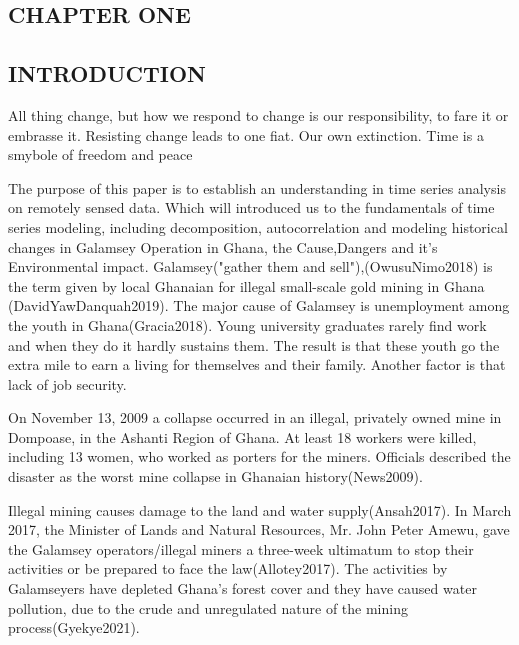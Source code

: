 \documentclass[10pt]{report}
\begin{document}
	\tableofcontents
	\begin{flushleft}
		\chapter{CHAPTER ONE}
		  \section{INTRODUCTION}
		  All thing change, but how we respond to change is our responsibility, to  fare it or embrasse it. Resisting change leads to one fiat. Our own extinction. Time is a smybole of freedom and peace
		  
		  The purpose of this paper is to establish an understanding in time series analysis on remotely sensed data. Which will introduced us to the fundamentals of time series modeling, including decomposition, autocorrelation and modeling historical changes in Galamsey Operation in Ghana, the Cause,Dangers and it’s Environmental impact.
		  Galamsey("gather them and sell"),(OwusuNimo2018) is the term given by local Ghanaian for illegal small-scale gold mining in Ghana (DavidYawDanquah2019). The major cause of Galamsey is unemployment among the youth in Ghana(Gracia2018). Young university graduates rarely find work and when they do it hardly sustains them. The result is that these youth go the extra mile to earn a living for themselves and their family.
		  Another factor is that lack of job security.
		  
		  On November 13, 2009 a collapse occurred in an illegal, privately owned mine in Dompoase, in the Ashanti Region of Ghana. At least 18 workers were killed, including 13 women, who worked as porters for the miners. Officials described the disaster as the worst mine collapse in Ghanaian history(News2009).
		  
		  Illegal mining causes damage to the land and water supply(Ansah2017). In March 2017, the Minister of Lands and Natural Resources, Mr. John Peter Amewu, gave the Galamsey operators/illegal miners a three-week ultimatum to stop their activities or be prepared to face the law(Allotey2017). The activities by Galamseyers have depleted Ghana’s forest cover and they have caused water pollution, due to the crude and unregulated nature of the mining process(Gyekye2021).
		  

\end{flushleft}
\end{document}
